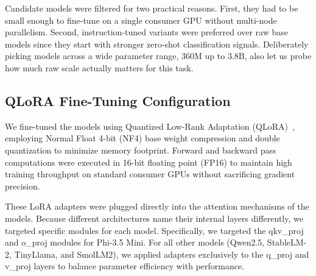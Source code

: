 \documentclass[journal]{IEEEtran}
\begin{document}
\begin{table}[htbp]
\caption{Selected Pretrained LLMs}
\label{tab:models}
\centering
{}
\end{table}

Candidate models were filtered for two practical reasons. First, they had to be small enough to fine-tune on a single consumer GPU without multi-node parallelism. Second, instruction-tuned variants were preferred over raw base models since they start with stronger zero-shot classification signals. Deliberately picking models across a wide parameter range, 360M up to 3.8B, also let us probe how much raw scale actually matters for this task.

\subsection{QLoRA Fine-Tuning Configuration}

We fine-tuned the models using Quantized Low-Rank Adaptation (QLoRA)~\cite{ref11}, employing Normal Float 4-bit (NF4) base weight compression and double quantization to minimize memory footprint. Forward and backward pass computations were executed in 16-bit floating point (FP16) to maintain high training throughput on standard consumer GPUs without sacrificing gradient precision.

These LoRA adapters were plugged directly into the attention mechanisms of the models. Because different architectures name their internal layers differently, we targeted specific modules for each model. Specifically, we targeted the qkv\_proj and o\_proj modules for Phi-3.5 Mini. For all other models (Qwen2.5, StableLM-2, TinyLlama, and SmolLM2), we applied adapters exclusively to the q\_proj and v\_proj layers to balance parameter efficiency with performance.
\end{document}
